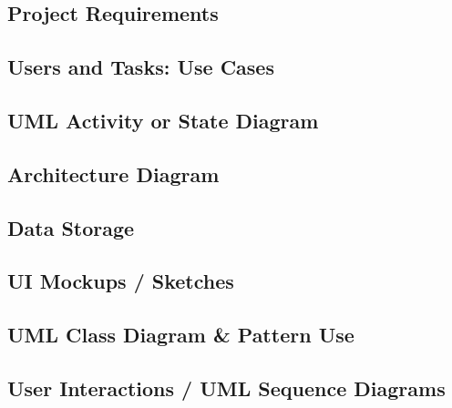 \documentclass[11pt]{amsart}
\begin{document}
\subsection*{Project Requirements} \phantom{}


\subsection*{Users and Tasks: Use Cases} \phantom{}
\subsection*{UML Activity or State Diagram} \phantom{}
\subsection*{Architecture Diagram} \phantom{}
\subsection*{Data Storage} \phantom{}
\subsection*{UI Mockups / Sketches} \phantom{}
\subsection*{UML Class Diagram \& Pattern Use} \phantom{}
\subsection*{User Interactions / UML Sequence Diagrams} \phantom{}




    
\end{document}

